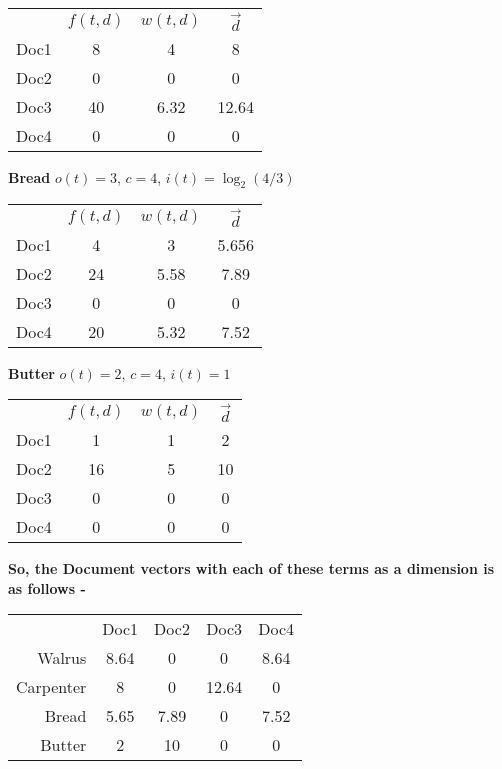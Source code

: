 \documentclass{article}
\begin{document}
\begin{tabular}{ r|c|c|c| }
\multicolumn{1}{r}{}
 & \multicolumn{1}{c}{$f(t,d)$}
 & \multicolumn{1}{c}{$w(t,d)$}
 & \multicolumn{1}{c}{$\vec{d}$} \\
\cline{2-4}
Doc1 & 8 & 4 & 8 \\
\cline{2-4}
Doc2 & 0 & 0 & 0 \\
\cline{2-4}
Doc3 & 40 & 6.32 & 12.64 \\
\cline{2-4}
Doc4 & 0 & 0 & 0 \\
\cline{2-4}
\end{tabular}

\vspace{5mm}
\textbf{Bread}
$o(t) = 3$, $c = 4$, $i(t) = \log_2(4/3)$

\begin{tabular}{ r|c|c|c| }
\multicolumn{1}{r}{}
 & \multicolumn{1}{c}{$f(t,d)$}
 & \multicolumn{1}{c}{$w(t,d)$}
 & \multicolumn{1}{c}{$\vec{d}$} \\
\cline{2-4}
Doc1 & 4 & 3 & 5.656 \\
\cline{2-4}
Doc2 & 24 & 5.58 & 7.89 \\
\cline{2-4}
Doc3 & 0 & 0 & 0 \\
\cline{2-4}
Doc4 & 20 & 5.32 & 7.52 \\
\cline{2-4}
\end{tabular}

\vspace{5mm}
\textbf{Butter}
$o(t) = 2$, $c = 4$, $i(t) = 1$


\begin{tabular}{ r|c|c|c| }
\multicolumn{1}{r}{}
 & \multicolumn{1}{c}{$f(t,d)$}
 & \multicolumn{1}{c}{$w(t,d)$}
 & \multicolumn{1}{c}{$\vec{d}$} \\
\cline{2-4}
Doc1 & 1 & 1 & 2 \\
\cline{2-4}
Doc2 & 16 & 5 & 10 \\
\cline{2-4}
Doc3 & 0 & 0 & 0 \\
\cline{2-4}
Doc4 & 0 & 0 & 0 \\
\cline{2-4}
\end{tabular}

\vspace{5mm}
\textbf{So, the Document vectors with each of these terms as a dimension is as follows - }

\begin{tabular}{ r|c|c|c|c| }
\multicolumn{1}{r}{}
 & \multicolumn{1}{c}{Doc1}
 & \multicolumn{1}{c}{Doc2}
 & \multicolumn{1}{c}{Doc3}
 & \multicolumn{1}{c}{Doc4} \\
\cline{2-5}
Walrus & 8.64 & 0 & 0 & 8.64 \\
\cline{2-5}
Carpenter & 8 & 0 & 12.64 & 0 \\
\cline{2-5}
Bread & 5.65 & 7.89 & 0 & 7.52 \\
\cline{2-5}
Butter & 2 & 10 & 0 & 0 \\
\cline{2-5}
\end{tabular}
\end{document}
